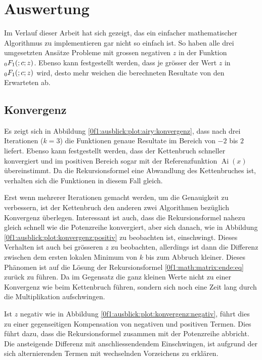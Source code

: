 %
%
%
\section{Auswertung
\label{0f1:section:teil3}}
Im Verlauf dieser Arbeit hat sich gezeigt, 
das ein einfacher mathematischer Algorithmus zu implementieren gar nicht so einfach ist.
So haben alle drei umgesetzten Ansätze Probleme mit grossen negativen $z$ in der Funktion $\mathstrut_0F_1(;c;z)$.
Ebenso kann festgestellt werden, dass je grösser der Wert $z$ in $\mathstrut_0F_1(;c;z)$ wird, desto mehr weichen die berechneten Resultate von den Erwarteten \cite{0f1:wolfram-0f1} ab.

\subsection{Konvergenz
\label{0f1:subsection:konvergenz}}
Es zeigt sich in Abbildung \ref{0f1:ausblick:plot:airy:konvergenz}, dass nach drei Iterationen ($k = 3$) die Funktionen genaue Resultate im Bereich von $-2$ bis $2$ liefert. Ebenso kann festgestellt werden, dass der Kettenbruch schneller konvergiert und im positiven Bereich sogar mit der Referenzfunktion $\operatorname{Ai}(x)$ übereinstimmt. Da die Rekursionsformel eine Abwandlung des Kettenbruches ist, verhalten sich die Funktionen in diesem Fall gleich.

Erst wenn mehrerer Iterationen gemacht werden, um die Genauigkeit zu verbessern, ist der Kettenbruch den anderen zwei Algorithmen bezüglich Konvergenz überlegen. 
Interessant ist auch, dass die Rekursionsformel nahezu gleich schnell wie die Potenzreihe konvergiert, aber sich danach, wie in Abbildung \ref{0f1:ausblick:plot:konvergenz:positiv} zu beobachten ist, einschwingt. Dieses Verhalten ist auch bei grösseren $z$ zu beobachten, allerdings ist dann die Differenz zwischen dem ersten lokalen Minimum von $k$ bis zum Abbruch kleiner.
Dieses Phänomen ist auf die Lösung der Rekursionsformel \eqref{0f1:math:matrix:ende:eq} zurück zu führen. Da im Gegensatz die ganz kleinen Werte nicht zu einer Konvergenz wie beim Kettenbruch führen, sondern sich noch eine Zeit lang durch die Multiplikation aufschwingen.

Ist $z$ negativ wie in Abbildung \ref{0f1:ausblick:plot:konvergenz:negativ}, führt dies zu einer gegenseitigen Kompensation von negativen und positiven Termen. Dies führt dazu, dass die Rekursionsformel zusammen mit der Potenzreihe abbricht.
Die ansteigende Differenz mit anschliessendendem Einschwingen, ist aufgrund der sich alternierenden Termen mit wechselnden Vorzeichens zu erklären.

